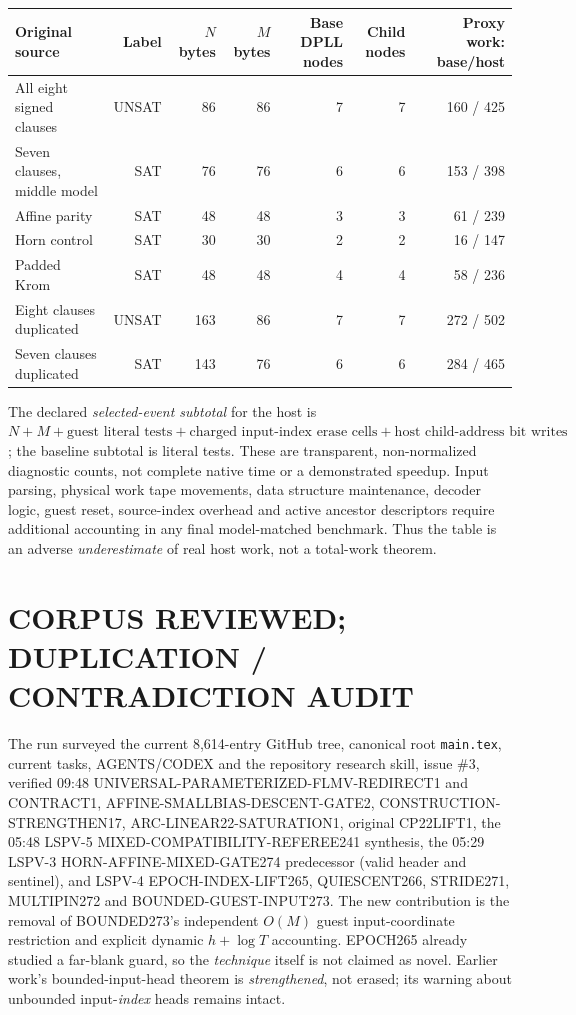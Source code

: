 \documentclass[11pt]{article}
\begin{document}
\begin{center}
\begin{tabular}{lrrrrrr}
\toprule
Original source & Label & $N$ bytes & $M$ bytes & Base DPLL nodes & Child nodes & Proxy work: base/host\\
\midrule
All eight signed clauses & UNSAT & 86 & 86 & 7 & 7 & 160 / 425\\
Seven clauses, middle model & SAT & 76 & 76 & 6 & 6 & 153 / 398\\
Affine parity & SAT & 48 & 48 & 3 & 3 & 61 / 239\\
Horn control & SAT & 30 & 30 & 2 & 2 & 16 / 147\\
Padded Krom & SAT & 48 & 48 & 4 & 4 & 58 / 236\\
Eight clauses duplicated & UNSAT & 163 & 86 & 7 & 7 & 272 / 502\\
Seven clauses duplicated & SAT & 143 & 76 & 6 & 6 & 284 / 465\\
\bottomrule
\end{tabular}
\end{center}
The declared \emph{selected-event subtotal} for the host is $N+M+\text{guest literal tests}+\text{charged input-index erase cells}+\text{host child-address bit writes}$; the baseline subtotal is literal tests. These are transparent, non-normalized diagnostic counts, not complete native time or a demonstrated speedup. Input parsing, physical work tape movements, data structure maintenance, decoder logic, guest reset, source-index overhead and active ancestor descriptors require additional accounting in any final model-matched benchmark. Thus the table is an adverse \emph{underestimate} of real host work, not a total-work theorem.

\section*{CORPUS REVIEWED; DUPLICATION / CONTRADICTION AUDIT}
The run surveyed the current 8,614-entry GitHub tree, canonical root \texttt{main.tex}, current tasks, AGENTS/CODEX and the repository research skill, issue \#3, verified 09:48 UNIVERSAL-PARAMETERIZED-FLMV-REDIRECT1 and CONTRACT1, AFFINE-SMALLBIAS-DESCENT-GATE2, CONSTRUCTION-STRENGTHEN17, ARC-LINEAR22-SATURATION1, original CP22LIFT1, the 05:48 LSPV-5 MIXED-COMPATIBILITY-REFEREE241 synthesis, the 05:29 LSPV-3 HORN-AFFINE-MIXED-GATE274 predecessor (valid header and sentinel), and LSPV-4 EPOCH-INDEX-LIFT265, QUIESCENT266, STRIDE271, MULTIPIN272 and BOUNDED-GUEST-INPUT273. The new contribution is the removal of BOUNDED273's independent $O(M)$ guest input-coordinate restriction and explicit dynamic $h+\log T$ accounting. EPOCH265 already studied a far-blank guard, so the \emph{technique} itself is not claimed as novel. Earlier work's bounded-input-head theorem is \emph{strengthened}, not erased; its warning about unbounded input-\emph{index} heads remains intact.
\end{document}

